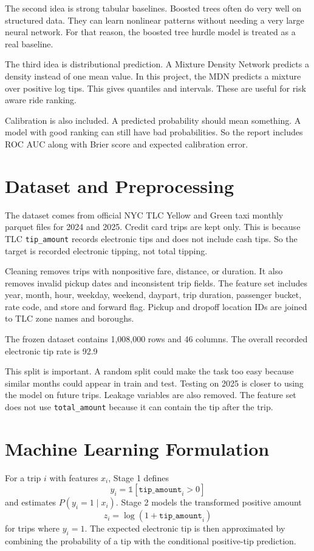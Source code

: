 \documentclass[11pt]{article}
\begin{document}
The second idea is strong tabular baselines. Boosted trees often do very well on structured data. They can learn nonlinear patterns without needing a very large neural network. For that reason, the boosted tree hurdle model is treated as a real baseline.

The third idea is distributional prediction. A Mixture Density Network predicts a density instead of one mean value. In this project, the MDN predicts a mixture over positive log tips. This gives quantiles and intervals. These are useful for risk aware ride ranking.

Calibration is also included. A predicted probability should mean something. A model with good ranking can still have bad probabilities. So the report includes ROC AUC along with Brier score and expected calibration error.

\section{Dataset and Preprocessing}
The dataset comes from official NYC TLC Yellow and Green taxi monthly parquet files for 2024 and 2025. Credit card trips are kept only. This is because TLC \texttt{tip\_amount} records electronic tips and does not include cash tips. So the target is recorded electronic tipping, not total tipping.

Cleaning removes trips with nonpositive fare, distance, or duration. It also removes invalid pickup dates and inconsistent trip fields. The feature set includes year, month, hour, weekday, weekend, daypart, trip duration, passenger bucket, rate code, and store and forward flag. Pickup and dropoff location IDs are joined to TLC zone names and boroughs.

The frozen dataset contains 1,008,000 rows and 46 columns. The overall recorded electronic tip rate is 92.9%

This split is important. A random split could make the task too easy because similar months could appear in train and test. Testing on 2025 is closer to using the model on future trips. Leakage variables are also removed. The feature set does not use \texttt{total\_amount} because it can contain the tip after the trip.

\section{Machine Learning Formulation}
For a trip $i$ with features $x_i$, Stage 1 defines
\[
y_i = \mathbb{1}[\texttt{tip\_amount}_i > 0]
\]
and estimates $P(y_i=1 \mid x_i)$. Stage 2 models the transformed positive amount
\[
z_i = \log(1+\texttt{tip\_amount}_i)
\]
for trips where $y_i=1$. The expected electronic tip is then approximated by combining the probability of a tip with the conditional positive-tip prediction.
\end{document}
